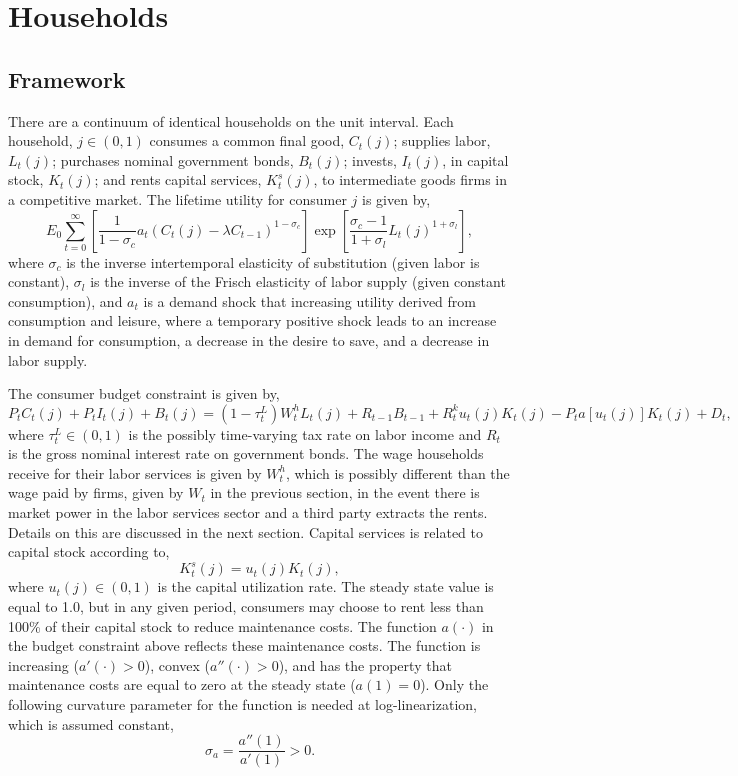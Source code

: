 \documentclass[11pt]{article}
\newcommand{\beq}{\begin{equation}}
\newcommand{\eeq}{\end{equation}}
\begin{document}
\section{Households}
\subsection{Framework}
There are a continuum of identical households on the unit interval.  Each  household, $j\in(0,1)$ consumes a common final good, $C_t(j)$; supplies labor, $L_t(j)$; purchases nominal government bonds, $B_t(j)$; invests, $I_t(j)$, in capital stock, $K_t(j)$; and rents capital services, $K_t^s(j)$, to intermediate goods firms in a competitive market.  The lifetime utility for consumer $j$ is given by,
\beq \label{eq:util} E_0 \sum_{t=0}^{\infty} \left[ \frac{1}{1-\sigma_c} a_t \left(C_t(j) - \lambda C_{t-1} \right)^{1-\sigma_c} \right] \exp{\left[\frac{\sigma_c-1}{1+\sigma_l} L_t(j)^{1+\sigma_l}\right]}, \eeq
where $\sigma_c$ is the inverse intertemporal elasticity of substitution (given labor is constant), $\sigma_l$ is the inverse of the Frisch elasticity of labor supply (given constant consumption), and $a_t$ is a demand shock that increasing utility derived from consumption and leisure, where a temporary positive shock leads to an increase in demand for consumption, a decrease in the desire to save, and a decrease in labor supply.

The consumer budget constraint is given by,
\beq \label{eq:budget} P_t C_t(j) + P_t I_t(j) + B_t(j) = (1-\tau_{t}^L)W_t^h L_t(j) + R_{t-1} B_{t-1} + R_t^k u_t(j) K_t(j) - P_t a\left[u_t(j)\right]K_t(j) + D_t, \eeq
where $\tau_t^L \in (0,1)$ is the possibly time-varying tax rate on labor income and $R_t$ is the gross nominal interest rate on government bonds.  The wage households receive for their labor services is given by $W_t^h$, which is possibly different than the wage paid by firms, given by $W_t$ in the previous section, in the event there is market power in the labor services sector and a third party extracts the rents.  Details on this are discussed in the next section.   Capital services is related to capital stock according to,
\beq K_t^s(j) = u_t(j) K_t(j), \eeq
where $u_t(j) \in (0,1)$ is the capital utilization rate.  The steady state value is equal to 1.0, but in any given period, consumers may choose to rent less than 100\% of their capital stock to reduce maintenance costs.  The function $a(\cdot)$ in the budget constraint above reflects these maintenance costs.  The function is increasing ($a'(\cdot)>0$), convex ($a''(\cdot)>0$), and has the property that maintenance costs are equal to zero at the steady state ($a(1)=0$).  Only the following curvature parameter for the function is needed at log-linearization, which is assumed constant,
\beq \sigma_a = \frac{a''(1)}{a'(1)} > 0. \eeq
\end{document}

